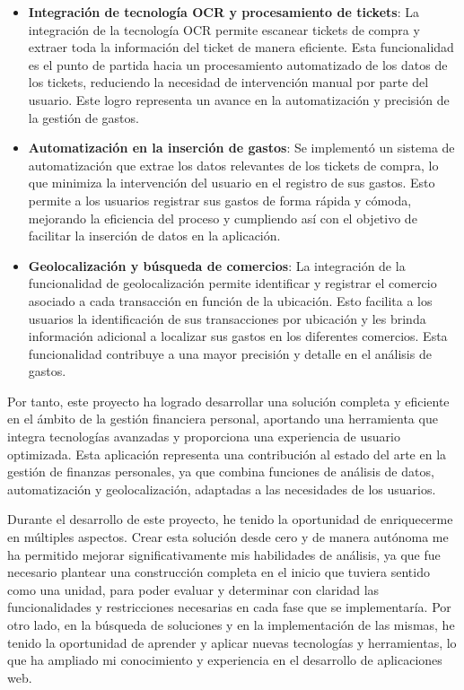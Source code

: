 \begin{itemize}
    \item \textbf{Integración de tecnología OCR y procesamiento de tickets}: La integración de la tecnología OCR permite escanear tickets de compra y extraer toda la información del ticket de manera eficiente. Esta funcionalidad es el punto de partida hacia un procesamiento automatizado de los datos de los tickets, reduciendo la necesidad de intervención manual por parte del usuario. Este logro representa un avance en la automatización y precisión de la gestión de gastos.

    \item \textbf{Automatización en la inserción de gastos}: Se implementó un sistema de automatización que extrae los datos relevantes de los tickets de compra, lo que minimiza la intervención del usuario en el registro de sus gastos. Esto permite a los usuarios registrar sus gastos de forma rápida y cómoda, mejorando la eficiencia del proceso y cumpliendo así con el objetivo de facilitar la inserción de datos en la aplicación.

    \item \textbf{Geolocalización y búsqueda de comercios}: La integración de la funcionalidad de geolocalización permite identificar y registrar el comercio asociado a cada transacción en función de la ubicación. Esto facilita a los usuarios la identificación de sus transacciones por ubicación y les brinda información adicional a localizar sus gastos en los diferentes comercios. Esta funcionalidad contribuye a una mayor precisión y detalle en el análisis de gastos.

\end{itemize}

Por tanto, este proyecto ha logrado desarrollar una solución completa y eficiente en el ámbito de la gestión financiera personal, aportando una herramienta que integra tecnologías avanzadas y proporciona una experiencia de usuario optimizada. Esta aplicación representa una contribución al estado del arte en la gestión de finanzas personales, ya que combina funciones de análisis de datos, automatización y geolocalización, adaptadas a las necesidades de los usuarios.

Durante el desarrollo de este proyecto, he tenido la oportunidad de enriquecerme en múltiples aspectos. Crear esta solución desde cero y de manera autónoma me ha permitido mejorar significativamente mis habilidades de análisis, ya que fue necesario plantear una construcción completa en el inicio que tuviera sentido como una unidad, para poder evaluar y determinar con claridad las funcionalidades y restricciones necesarias en cada fase que se implementaría. Por otro lado, en la búsqueda de soluciones y en la implementación de las mismas, he tenido la oportunidad de aprender y aplicar nuevas tecnologías y herramientas, lo que ha ampliado mi conocimiento y experiencia en el desarrollo de aplicaciones web.


